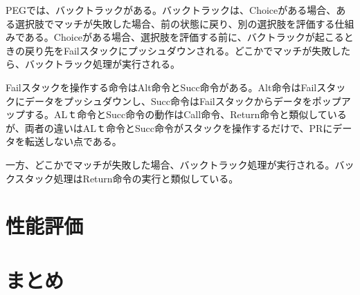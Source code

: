 \documentclass[paper]{ieicej}
\begin{document}
PEGでは、バックトラックがある。バックトラックは、Choiceがある場合、ある選択肢でマッチが失敗した場合、前の状態に戻り、別の選択肢を評価する仕組みである。Choiceがある場合、選択肢を評価する前に、バクトラックが起こるときの戻り先をFailスタックにプッシュダウンされる。どこかでマッチが失敗したら、バックトラック処理が実行される。

Failスタックを操作する命令はAlt命令とSucc命令がある。Alt命令はFailスタックにデータをプッシュダウンし、Succ命令はFailスタックからデータをポップアップする。ALｔ命令とSucc命令の動作はCall命令、Return命令と類似しているが、両者の違いはALｔ命令とSucc命令がスタックを操作するだけで、PRにデータを転送しない点である。

一方、どこかでマッチが失敗した場合、バックトラック処理が実行される。バックスタック処理はReturn命令の実行と類似している。


\section{性能評価}




\section{まとめ}

\ack %

%
%
\begin{thebibliography}{99}%
\bibitem{}
\end{thebibliography}

\appendix
\section{}

\begin{biography}
\profile{}{}{}
\end{biography}
\end{document}

